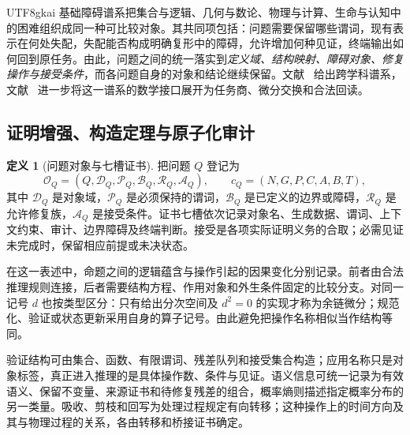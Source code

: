 \documentclass[11pt,a4paper]{article}
\theoremstyle{plain}
\theoremstyle{definition}
\newtheorem{definition}[theorem]{定义}
\theoremstyle{remark}
\begin{document}
\begin{CJK*}{UTF8}{gkai}
基础障碍谱系把集合与逻辑、几何与数论、物理与计算、生命与认知中的困难组织成同一种可比较对象。其共同项包括：问题需要保留哪些谓词，现有表示在何处失配，失配能否构成明确复形中的障碍，允许增加何种见证，终端输出如何回到原任务。由此，问题之间的统一落实到\emph{定义域、结构映射、障碍对象、修复操作与接受条件}，而各问题自身的对象和结论继续保留。文献~\cite{S37} 给出跨学科谱系，文献~\cite{S38} 进一步将这一谱系的数学接口展开为任务商、微分交换和合法回读。

\subsection{证明增强、构造定理与原子化审计}

\begin{definition}[问题对象与七槽证书]
把问题 $Q$ 登记为
\[
 \mathcal O_Q=(Q,\mathcal D_Q,\mathcal P_Q,\mathcal B_Q,
              \mathcal R_Q,\mathcal A_Q),\qquad
 c_Q=(N,G,P,C,A,B,T),
\]
其中 $\mathcal D_Q$ 是对象域，$\mathcal P_Q$ 是必须保持的谓词，$\mathcal B_Q$ 是已定义的边界或障碍，$\mathcal R_Q$ 是允许修复族，$\mathcal A_Q$ 是接受条件。证书七槽依次记录对象名、生成数据、谓词、上下文约束、审计、边界障碍及终端判断。接受是各项实际证明义务的合取；必需见证未完成时，保留相应前提或未决状态。
\end{definition}

在这一表述中，命题之间的逻辑蕴含与操作引起的因果变化分别记录。前者由合法推理规则连接，后者需要结构方程、作用对象和外生条件固定的比较分支。对同一记号 $d$ 也按类型区分：只有给出分次空间及 $d^2=0$ 的实现才称为余链微分；规范化、验证或状态更新采用自身的算子记号。由此避免把操作名称相似当作结构等同。

验证结构可由集合、函数、有限谓词、残差队列和接受集合构造；应用名称只是对象标签，真正进入推理的是具体操作数、条件与见证。语义信息可统一记录为有效语义、保留不变量、来源证书和待修复残差的组合，概率熵则描述指定概率分布的另一类量。吸收、剪枝和回写为处理过程规定有向转移；这种操作上的时间方向及其与物理过程的关系，各由转移和桥接证书确定。


\end{CJK*}
\end{document}
